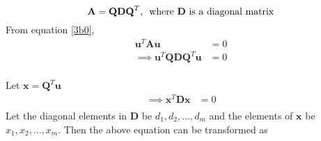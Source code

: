 \documentclass[12pt, letterpaper]{article}
\begin{document}
\begin{equation}\label{3b0}
    \mathbf{A} = \mathbf{QDQ}^T,\,
    \text{ where \textbf{D} is a diagonal matrix}
\end{equation}
From equation \eqref{3b0},
\begin{align*}
  \mathbf{u}^T\mathbf{Au} &= 0\\
  \implies \mathbf{u}^T\mathbf{QDQ}^T\mathbf{u} &= 0\\
\end{align*}

Let $\mathbf{x} = \mathbf{Q}^T\mathbf{u}$
\begin{align*}
  \implies \mathbf{x}^T\mathbf{Dx} &= 0\\
\end{align*}
Let the diagonal elements in $\mathbf{D}$ be $d_1, d_2, ..., d_m$ and the elements of $\mathbf{x}$ be $x_1, x_2, ..., x_m$. Then the above equation can be transformed as
\end{document}
